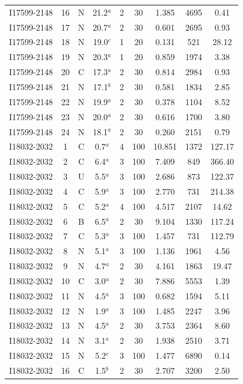 \begin{table}
\begin{tabular}{ccccccccc}
I17599-2148 & 16 & N & 21.2$^{a}$ & 2 & 30 & 1.385 & 4695 & 0.41 \\
I17599-2148 & 17 & N & 20.7$^{a}$ & 2 & 30 & 0.601 & 2695 & 0.93 \\
I17599-2148 & 18 & N & 19.0$^{c}$ & 1 & 20 & 0.131 & 521 & 28.12 \\
I17599-2148 & 19 & N & 20.3$^{a}$ & 1 & 20 & 0.859 & 1974 & 3.38 \\
I17599-2148 & 20 & C & 17.3$^{a}$ & 2 & 30 & 0.814 & 2984 & 0.93 \\
I17599-2148 & 21 & N & 17.1$^{b}$ & 2 & 30 & 0.581 & 1834 & 2.85 \\
I17599-2148 & 22 & N & 19.9$^{a}$ & 2 & 30 & 0.378 & 1104 & 8.52 \\
I17599-2148 & 23 & N & 20.0$^{a}$ & 2 & 30 & 0.616 & 1700 & 3.80 \\
I17599-2148 & 24 & N & 18.1$^{a}$ & 2 & 30 & 0.260 & 2151 & 0.79 \\
I18032-2032 & 1 & C & 0.7$^{a}$ & 4 & 100 & 10.851 & 1372 & 127.17 \\
I18032-2032 & 2 & C & 6.4$^{a}$ & 3 & 100 & 7.409 & 849 & 366.40 \\
I18032-2032 & 3 & U & 5.5$^{a}$ & 3 & 100 & 2.686 & 873 & 122.37 \\
I18032-2032 & 4 & C & 5.9$^{a}$ & 3 & 100 & 2.770 & 731 & 214.38 \\
I18032-2032 & 5 & C & 5.2$^{a}$ & 4 & 100 & 4.517 & 2107 & 14.62 \\
I18032-2032 & 6 & B & 6.5$^{a}$ & 2 & 30 & 9.104 & 1330 & 117.24 \\
I18032-2032 & 7 & C & 5.3$^{a}$ & 3 & 100 & 1.457 & 731 & 112.79 \\
I18032-2032 & 8 & N & 5.1$^{a}$ & 3 & 100 & 1.136 & 1961 & 4.56 \\
I18032-2032 & 9 & N & 4.7$^{a}$ & 2 & 30 & 4.161 & 1863 & 19.47 \\
I18032-2032 & 10 & C & 3.0$^{a}$ & 2 & 30 & 7.886 & 5553 & 1.39 \\
I18032-2032 & 11 & N & 4.5$^{a}$ & 3 & 100 & 0.682 & 1594 & 5.11 \\
I18032-2032 & 12 & N & 1.9$^{a}$ & 3 & 100 & 1.485 & 2247 & 3.96 \\
I18032-2032 & 13 & N & 4.5$^{a}$ & 2 & 30 & 3.753 & 2364 & 8.60 \\
I18032-2032 & 14 & N & 3.1$^{a}$ & 2 & 30 & 1.938 & 2510 & 3.71 \\
I18032-2032 & 15 & N & 5.2$^{c}$ & 3 & 100 & 1.477 & 6890 & 0.14 \\
I18032-2032 & 16 & C & 1.5$^{b}$ & 2 & 30 & 2.707 & 3200 & 2.50 \\

\end{tabular}
\end{table}
